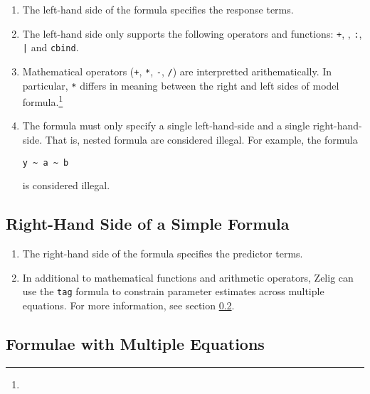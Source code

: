 \documentclass{article}
\begin{document}
\begin{enumerate}

  \item The left-hand side of the formula specifies the response terms.

  \item The left-hand side only supports the following operators and functions:
    {\tt +}, {\tt *}, {\tt :}, {\tt |} and {\tt cbind}.

  \item Mathematical operators (\verb|+|, \verb|*|, \verb|-|, \verb|/|) are
    interpretted arithematically. In particular, \verb|*| differs in meaning
    between the right and left sides of model formula.\footnote{}

  \item The formula must only specify a single left-hand-side and a single
    right-hand-side. That is, nested formula are considered illegal. For
    example, the formula \begin{verbatim}y ~ a ~ b\end{verbatim} is considered 
    illegal.

\end{enumerate}


\subsection{Right-Hand Side of a Simple Formula}
\label{subsec:rhs}

\begin{enumerate}

  \item The right-hand side of the formula specifies the predictor terms.

  \item In additional to mathematical functions and arithmetic operators, Zelig
    can use the \verb|tag| formula to constrain parameter estimates across
    multiple equations. For more information, see section \ref{subsec:multiple}.

\end{enumerate}


\subsection{Formulae with Multiple Equations}
\label{subsec:multiple}
\end{document}
